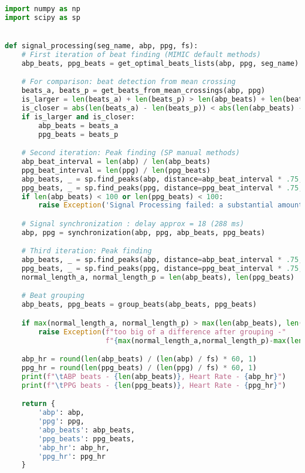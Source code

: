 \begin{lstlisting}[language=Python,label={lst:sp.py}, basicstyle=\scriptsize]
import numpy as np
import scipy as sp


def signal_processing(seg_name, abp, ppg, fs):
    # First iteration of beat finding (MIMIC default methods)
    abp_beats, ppg_beats = get_optimal_beats_lists(abp, ppg, seg_name)

    # For comparison: beat detection from mean crossing
    beats_a, beats_p = get_beats_from_mean_crossings(abp, ppg)
    is_larger = len(beats_a) + len(beats_p) > len(abp_beats) + len(beats_p)
    is_closer = abs(len(beats_a) - len(beats_p)) < abs(len(abp_beats) - len(ppg_beats))
    if is_larger and is_closer:
        abp_beats = beats_a
        ppg_beats = beats_p

    # Second iteration: Peak finding (SP manual methods)
    abp_beat_interval = len(abp) / len(abp_beats)
    ppg_beat_interval = len(ppg) / len(ppg_beats)
    abp_beats, _ = sp.find_peaks(abp, distance=abp_beat_interval * .75, prominence=0.5)
    ppg_beats, _ = sp.find_peaks(ppg, distance=ppg_beat_interval * .75, prominence=0.01)
    if len(abp_beats) < 100 or len(ppg_beats) < 100:
        raise Exception('Signal Processing failed: a substantial amount of beats not found')

    # Signal synchronization : delay approx = 18 (288 ms)
    abp, ppg = synchronization(abp, ppg, abp_beats, ppg_beats)

    # Third iteration: Peak finding
    abp_beats, _ = sp.find_peaks(abp, distance=abp_beat_interval * .75, prominence=0.5)
    ppg_beats, _ = sp.find_peaks(ppg, distance=ppg_beat_interval * .75, prominence=0.01)
    normal_length_a, normal_length_p = len(abp_beats), len(ppg_beats)

    # Beat grouping
    abp_beats, ppg_beats = group_beats(abp_beats, ppg_beats)

    if max(normal_length_a, normal_length_p) > max(len(abp_beats), len(ppg_beats)) * 1.05:
        raise Exception(f"too big of a difference after grouping -"
                        f"{max(normal_length_a,normal_length_p)-max(len(abp_beats),len(ppg_beats))}")

    abp_hr = round(len(abp_beats) / (len(abp) / fs) * 60, 1)
    ppg_hr = round(len(ppg_beats) / (len(ppg) / fs) * 60, 1)
    print(f"\tABP beats - {len(abp_beats)}, Heart Rate - {abp_hr}")
    print(f"\tPPG beats - {len(ppg_beats)}, Heart Rate - {ppg_hr}")

    return {
        'abp': abp,
        'ppg': ppg,
        'abp_beats': abp_beats,
        'ppg_beats': ppg_beats,
        'abp_hr': abp_hr,
        'ppg_hr': ppg_hr
    }



\end{lstlisting}
